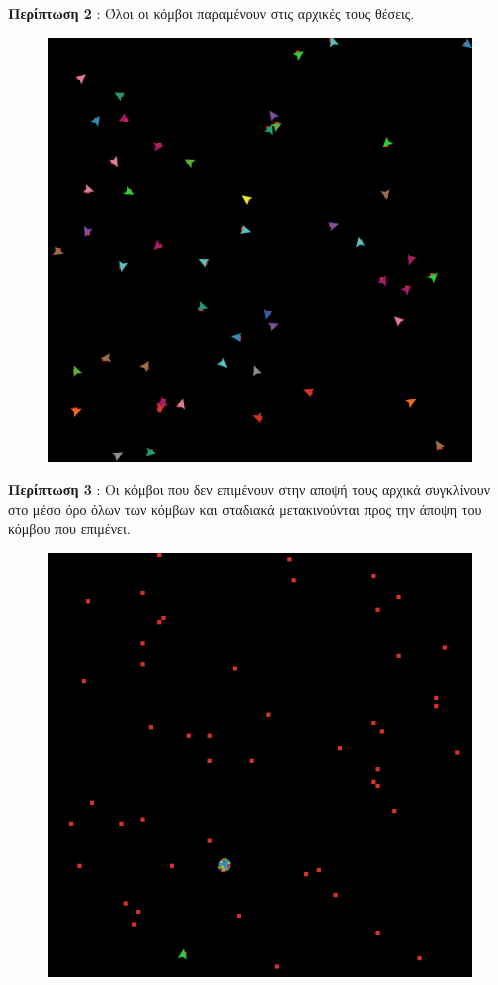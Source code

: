 \documentclass[11pt]{report}
\begin{document}
\begin{center}
		\textbf{Περίπτωση 2} : Όλοι οι κόμβοι παραμένουν στις αρχικές τους θέσεις.
		 \begin{figure}[h] 
		 	\centering \includegraphics[scale=0.40]{pics/Friedkin-Johnsen_model view2.png} 
	 	 \end{figure}
		
		\pagebreak
		
		\textbf{Περίπτωση 3} : Οι κόμβοι που δεν επιμένουν στην αποψή τους αρχικά συγκλίνουν στο μέσο όρο όλων των κόμβων και σταδιακά μετακινούνται προς την άποψη του κόμβου που επιμένει. 
		\begin{figure}[h]
		 \centering \includegraphics[scale=0.40]{pics/Friedkin-Johnsen_model view3.png} 
		\end{figure}
	

\end{center}
\end{document}
